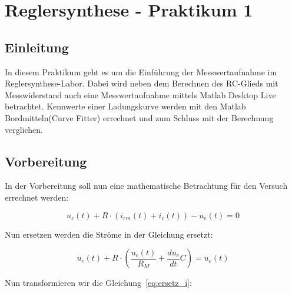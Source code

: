 \documentclass{report}
\begin{document}

\newpage

\tableofcontents

\listoffigures

\newpage
\chapter{Reglersynthese - Praktikum 1}
\section{Einleitung}

In diesem Praktikum geht es um die Einführung der Messwertaufnahme im Reglersynthese-Labor. Dabei wird neben dem Berechnen des RC-Glieds mit Messwiderstand auch eine Messwertaufnahme mittels Matlab Desktop Live betrachtet. Kennwerte einer Ladungskurve werden mit den Matlab Bordmitteln(Curve Fitter) errechnet und zum Schluss mit der Berechnung verglichen.


\section{Vorbereitung}
In der Vorbereitung soll nun eine mathematische Betrachtung für den Versuch errechnet werden:

\begin{equation}
  u_c(t) + R\cdot (i_{rm}(t)+i_c(t)) - u_e(t) = 0 
  \label{eq:masche}
\end{equation}

Nun ersetzen werden die Ströme in der Gleichung ersetzt:

\begin{equation}
  u_c(t) + R\cdot (\frac{u_c(t)}{R_M}+\frac{du_c}{dt} C) = u_e(t)  
  \label{eq:ersetz_i}
\end{equation}

Nun transformieren wir die Gleichung~\ref{eq:ersetz_i}:
\end{document}
